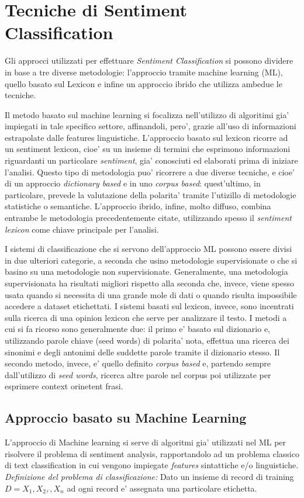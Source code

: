 \documentclass[a4paper,12pt,openright,twoside]{report}
\theoremstyle{definition}
\begin{document}
\section{Tecniche di Sentiment Classification}
Gli approcci utilizzati per effettuare \emph{Sentiment Classification}
si possono dividere in base a tre diverse metodologie: l'approccio tramite
machine learning (ML), quello basato sul Lexicon e infine un approccio ibrido
che utilizza ambedue le tecniche.

Il metodo basato sul machine learning si focalizza nell'utilizzo di algoritimi
gia' impiegati in tale specifico settore, affinandoli, pero', grazie all'uso 
di informazioni estrapolate dalle features linguistiche.
L'approccio basato sul lexicon ricorre ad un sentiment lexicon,
cioe' su un insieme di termini che esprimono informazioni riguardanti un particolare
\emph{sentiment}, gia' conosciuti ed elaborati prima di iniziare l'analisi.
Questo tipo di metodologia puo' ricorrere a due diverse tecniche,
e cioe' di 
un approccio \emph{dictionary based} e in uno \emph{corpus based}:
quest'ultimo, in particolare, prevede la valutazione della polarita'
tramite l'utizillo di metodologie statistiche o
semantiche.
L'approccio ibrido, infine, molto diffuso, combina entrambe le metodologia precedentemente
citate, utilizzando spesso il \emph{sentiment lexicon} come chiave principale per l'analisi.

I sistemi di classificazione che  si servono dell'approccio ML possono essere 
divisi in due ulteriori categorie, a seconda che usino metodologie supervisionate
o che si basino su una metodologie non supervisionate. Generalmente, una metodologia
supervisionata ha risultati migliori rispetto alla seconda che, invece,
viene spesso usata quando si necessita di una grande mole di dati o quando risulta
impossibile accedere a dataset etichettati.
I sistemi basati sul lexicon, invece, sono incentrati sulla ricerca di una opinion lexicon
che serve per analizzare il testo. I metodi a cui si fa ricorso sono generalmente due:
il primo e' basato sul dizionario e, utilizzando parole chiave (seed words) di polarita' nota,
effettua una ricerca dei sinonimi e degli antonimi delle suddette parole tramite il dizionario stesso.
Il secondo metodo, invece, e' quello definito \emph{corpus based} e, partendo sempre dall'utilizzo di
\emph{seed words}, ricerca altre parole nel corpus poi utilizzate
per esprimere context orinetent frasi. %
\subsection{Approccio basato su Machine Learning}
L'approccio di Machine learning si serve di algoritmi gia' utilizzati nel ML per risolvere il problema
di sentiment analysis, rapportandolo ad un problema classico di text classification 
in cui vengono impiegate
\emph{features} sintattiche e/o linguistiche.
\emph{Definizione del problema di classificazione:} Dato un insieme di record di training 
$D = {X_1, X_2,\ddot{},X_n}$ ad ogni record e' assegnata una particolare etichetta.
\end{document}
